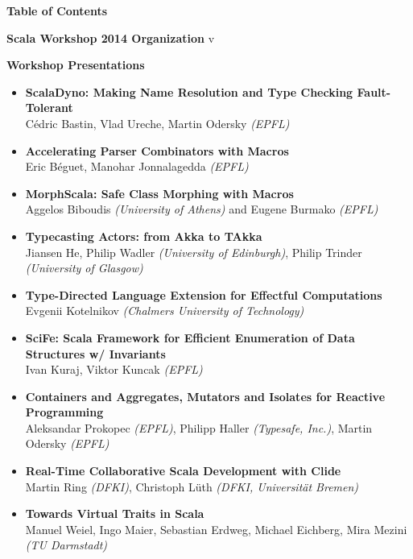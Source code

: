 \documentclass[10pt]{book}
\title{}
\date{}
\begin{document}
\thispagestyle{empty}


{\centering \LARGE \bf Table of Contents\par}

\vspace{0.5cm}
\large \textbf{Scala Workshop 2014 Organization}  v
\normalsize

\vspace{0.5cm}
\large \textbf{Workshop Presentations}
\normalsize
\begin{itemize}
\item {\bf ScalaDyno: Making Name Resolution and Type Checking Fault-Tolerant} \\
C\'{e}dric Bastin, Vlad Ureche, Martin Odersky {\em (EPFL)}
\item {\bf Accelerating Parser Combinators with Macros} \\
Eric B\'{e}guet, Manohar Jonnalagedda {\em (EPFL)}
\item {\bf MorphScala: Safe Class Morphing with Macros} \\
Aggelos Biboudis {\em (University of Athens)} and Eugene Burmako {\em (EPFL)}
\item {\bf Typecasting Actors: from Akka to TAkka} \\
Jiansen He, Philip Wadler {\em (University of Edinburgh)}, Philip Trinder {\em (University of Glasgow)}
\item {\bf Type-Directed Language Extension for Effectful Computations} \\
Evgenii Kotelnikov {\em (Chalmers University of Technology)}
\item {\bf SciFe: Scala Framework for Efficient Enumeration of Data Structures w/ Invariants} \\
Ivan Kuraj, Viktor Kuncak {\em (EPFL)}
\item {\bf Containers and Aggregates, Mutators and Isolates for Reactive Programming} \\
Aleksandar Prokopec {\em(EPFL)}, Philipp Haller {\em(Typesafe, Inc.)}, Martin Odersky {\em(EPFL)}
\item {\bf Real-Time Collaborative Scala Development with Clide} \\
Martin Ring {\em(DFKI)}, Christoph L\"{u}th {\em(DFKI, Universit\"{a}t Bremen)}
\item {\bf Towards Virtual Traits in Scala} \\
Manuel Weiel, Ingo Maier, Sebastian Erdweg, Michael Eichberg, Mira Mezini {\em(TU Darmstadt)}
\end{itemize}
\end{document}
